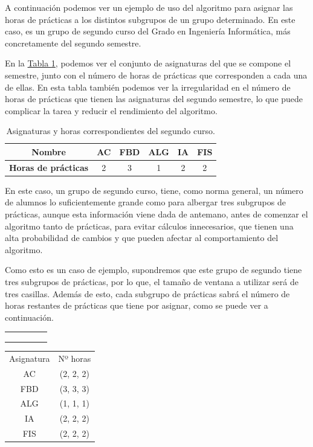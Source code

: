 A continuación podemos ver un ejemplo de uso del algoritmo para asignar las horas de prácticas a los distintos subgrupos de un grupo determinado. En este caso, es un grupo de segundo curso del Grado en Ingeniería Informática, más concretamente del segundo semestre.

En la \hyperref[pasig]{Tabla \ref*{pasig}}, podemos ver el conjunto de asignaturas del que se compone el semestre, junto con el número de horas de prácticas que corresponden a cada una de ellas. En esta tabla también podemos ver la irregularidad en el número de horas de prácticas que tienen las asignaturas del segundo semestre, lo que puede complicar la tarea y reducir el rendimiento del algoritmo.
\begin{table}[H]
\center
\begin{tabular}{c | c  c  c  c  c}
\textbf{Nombre} & AC & FBD & ALG & IA & FIS \\
\hline
\textbf{Horas de prácticas}  & 2 & 3 & 1 & 2 & 2 \\
\end{tabular}
\caption{Asignaturas y horas correspondientes del segundo curso.}
\label{pasig}
\end{table}

En este caso, un grupo de segundo curso, tiene, como norma general, un número de alumnos lo suficientemente grande como para albergar tres subgrupos de prácticas, aunque esta información viene dada de antemano, antes de comenzar el algoritmo tanto de prácticas, para evitar cálculos innecesarios, que tienen una alta probabilidad de cambios y que pueden afectar al comportamiento del algoritmo.

Como esto es un caso de ejemplo, supondremos que este grupo de segundo tiene tres subgrupos de prácticas, por lo que, el tamaño de ventana a utilizar será de tres casillas. Además de esto, cada subgrupo de prácticas sabrá el número de horas restantes de prácticas que tiene por asignar, como se puede ver a continuación.\\

\begin{minipage}{0.5\textwidth}    
\begin{tabular}{| c | c | c | c | c |}
\hline
 &  &  &  & \\
 \hline
 &  &  &  & \\
 \hline
 &  &  &  & \\
 \hline
 &  &  &  & \\
 \hline 
\end{tabular}
\end{minipage}
\begin{minipage}{0.5\textwidth}
\begin{tabular}{c | c}
Asignatura & Nº horas \\
AC & (2, 2, 2) \\
FBD & (3, 3, 3) \\
ALG & (1, 1, 1) \\
IA & (2, 2, 2) \\
FIS & (2, 2, 2)
\end{tabular}
\end{minipage}
~\\

